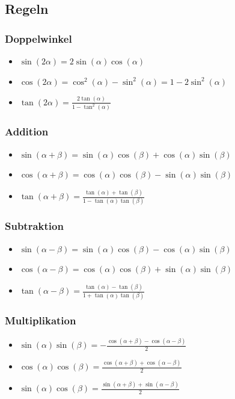 \documentclass[a4paper,10pt]{article}
\begin{document}
\subsection{Regeln}

\subsubsection{Doppelwinkel}
\begin{itemize}
	\item $\sin(2\alpha) = 2 \sin(\alpha) \cos(\alpha)$
	\item $\cos(2\alpha) = \cos^2(\alpha) - \sin^2(\alpha) = 1 - 2 \sin^2(\alpha)$
	\item $\tan(2\alpha) = \frac{2\tan(\alpha)}{1 - \tan^2(\alpha)}$
\end{itemize}

\subsubsection{Addition}
\begin{itemize}
	\item $\sin(\alpha + \beta) = \sin(\alpha) \cos(\beta) + \cos(\alpha) \sin(\beta)$
	\item $\cos(\alpha + \beta) = \cos(\alpha) \cos(\beta) - \sin(\alpha) \sin(\beta)$
	\item $\tan(\alpha + \beta) = \frac{\tan(\alpha) + \tan(\beta)}{1 - \tan(\alpha) \tan(\beta)}$
\end{itemize}

\subsubsection{Subtraktion}
\begin{itemize}
	\item $\sin(\alpha - \beta) = \sin(\alpha) \cos(\beta) - \cos(\alpha)\sin(\beta)$
	\item $\cos(\alpha - \beta) = \cos(\alpha) \cos(\beta) + \sin(\alpha)\sin(\beta)$
	\item $\tan(\alpha - \beta) = \frac{\tan(\alpha) - \tan(\beta)}{1+\tan(\alpha) \tan(\beta)}$
\end{itemize}

\subsubsection{Multiplikation}
\begin{itemize}
	\item $\sin(\alpha) \sin(\beta) = -\frac{\cos(\alpha + \beta) - \cos(\alpha - \beta)}{2}$
	\item $\cos(\alpha) \cos(\beta) =  \frac{\cos(\alpha + \beta) + \cos(\alpha - \beta)}{2}$
	\item $\sin(\alpha) \cos(\beta) =  \frac{\sin(\alpha + \beta) + \sin(\alpha - \beta)}{2}$
\end{itemize}
\end{document}
